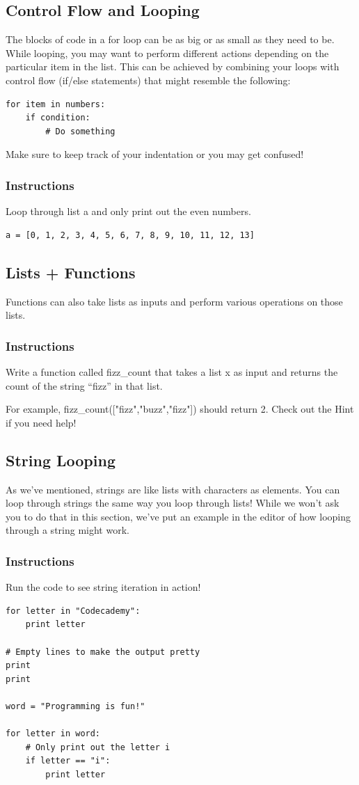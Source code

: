 \documentclass[12pt,a4paper,final,twoside,onecolumn,titlepage]{book}
\begin{document}
\subsection{Control Flow and Looping}

The blocks of code in a for loop can be as big or as small as they need to be. While looping, you may want to perform different actions depending on the particular item in the list. This can be achieved by combining your loops with control flow (if/else statements) that might resemble the following:
\begin{lstlisting}
for item in numbers: 
    if condition: 
        # Do something
\end{lstlisting}
Make sure to keep track of your indentation or you may get confused!
\subsubsection{Instructions}
Loop through list a and only print out the even numbers.
\begin{lstlisting}
a = [0, 1, 2, 3, 4, 5, 6, 7, 8, 9, 10, 11, 12, 13]
\end{lstlisting}

\subsection{Lists + Functions}

Functions can also take lists as inputs and perform various operations on those lists.
\subsubsection{Instructions}

Write a function called fizz\_count that takes a list x as input and returns the count of the string “fizz” in that list.

For example, fizz\_count(["fizz","buzz","fizz"]) should return 2. Check out the Hint if you need help!

\subsection{String Looping}

As we've mentioned, strings are like lists with characters as elements. You can loop through strings the same way you loop through lists! While we won't ask you to do that in this section, we've put an example in the editor of how looping through a string might work.
\subsubsection{Instructions}
Run the code to see string iteration in action!
\begin{lstlisting}
for letter in "Codecademy":
    print letter
    
# Empty lines to make the output pretty
print
print

word = "Programming is fun!"

for letter in word:
    # Only print out the letter i
    if letter == "i":
        print letter
\end{lstlisting}
\end{document}
